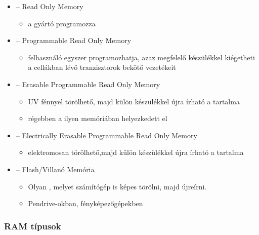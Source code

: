 \documentclass[../main.tex]{subfiles}
\begin{document}
\begin{itemize}
	\item {} \tabto{1.7cm} – \tabto{2.5cm}
	      Read Only Memory
	      \begin{itemize}
		      \item a gyártó programozza
	      \end{itemize}

	\item {} \tabto{1.7cm} – \tabto{2.5cm}
	      Programmable Read Only Memory
	      \begin{itemize}
		      \item felhasználó egyszer programozhatja,
		            azaz megfelelő készülékkel kiégetheti
		            a cellákban lévő tranzisztorok bekötő vezetékeit
	      \end{itemize}

	\item {} \tabto{1.7cm} – \tabto{2.5cm}
	      Erasable Programmable Read Only Memory
	      \begin{itemize}
		      \item UV fénnyel törölhető, majd külön
		            készülékkel újra írható a tartalma

		      \item régebben a  ilyen
		            memóriában helyezkedett el
	      \end{itemize}

	\item {} \tabto{1.7cm} – \tabto{2.5cm}
	      Electrically Erasable Programmable Read Only Memory
	      \begin{itemize}
		      \item elektromosan törölhető,majd külön
		            készülékkel újra írható a tartalma
	      \end{itemize}

	\item {} \tabto{1.7cm} – \tabto{2.5cm}
	      Flash/Villanó Memória
	      \begin{itemize}
		      \item Olyan , melyet számítógép
		            is képes törölni, majd újreírni.

		      \item Pendrive-okban, fényképezőgépekben
	      \end{itemize}
\end{itemize}

\subsubsection*{RAM típusok}
\end{document}
